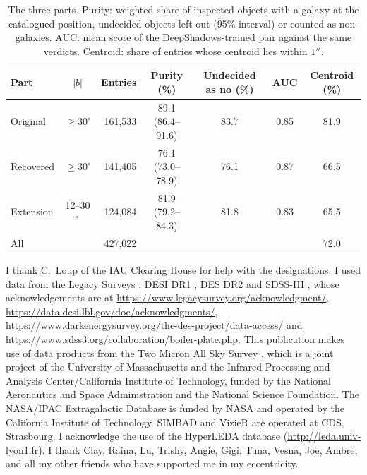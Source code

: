 \documentclass{aastex701}
\begin{document}
\begin{table}[h]
\centering
\caption{The three parts. Purity: weighted share of inspected objects with a
galaxy at the catalogued position, undecided objects left out (95\% interval)
or counted as non-galaxies. AUC: mean score of the DeepShadows-trained pair
against the same verdicts. Centroid: share of entries whose centroid lies
within $1''$.\label{tab:parts}}
\begin{tabular}{lcrcccc}
\hline
Part & $|b|$ & Entries & Purity (\%) & Undecided as no (\%) & AUC & Centroid (\%) \\
\hline
Original & $\ge 30^\circ$ & 161,533 & 89.1 (86.4--91.6) & 83.7 & 0.85 & 81.9 \\
Recovered & $\ge 30^\circ$ & 141,405 & 76.1 (73.0--78.9) & 76.1 & 0.87 & 66.5 \\
Extension & 12--30$^\circ$ & 124,084 & 81.9 (79.2--84.3) & 81.8 & 0.83 & 65.5 \\
All & & 427,022 & & & & 72.0 \\
\hline
\end{tabular}
\end{table}

\begin{acknowledgments}
I thank C.~Loup of the IAU Clearing House for help with the designations. I used
data from the Legacy Surveys \citep{dey2019}, DESI DR1 \citep{desidr1}, DES DR2
\citep{abbott2021des} and SDSS-III \citep{alam2015}, whose acknowledgements are
at \url{https://www.legacysurvey.org/acknowledgment/},
\url{https://data.desi.lbl.gov/doc/acknowledgments/},
\url{https://www.darkenergysurvey.org/the-des-project/data-access/} and
\url{https://www.sdss3.org/collaboration/boiler-plate.php}. This publication
makes use of data products from the Two Micron All Sky Survey \citep{skrutskie2006},
which is a joint project of the University of Massachusetts and the Infrared
Processing and Analysis Center/California Institute of Technology, funded by the
National Aeronautics and Space Administration and the National Science
Foundation. The NASA/IPAC Extragalactic Database is funded by NASA and operated
by the California Institute of Technology. SIMBAD and VizieR are operated at
CDS, Strasbourg. I acknowledge the use of the HyperLEDA database
(\url{http://leda.univ-lyon1.fr}). I thank Clay, Raina, Lu, Trishy, Angie, Gigi, Tuna, Vesna, Joe, Ambre, and all my
other friends who have supported me in my eccentricity.
\end{acknowledgments}

\end{document}
